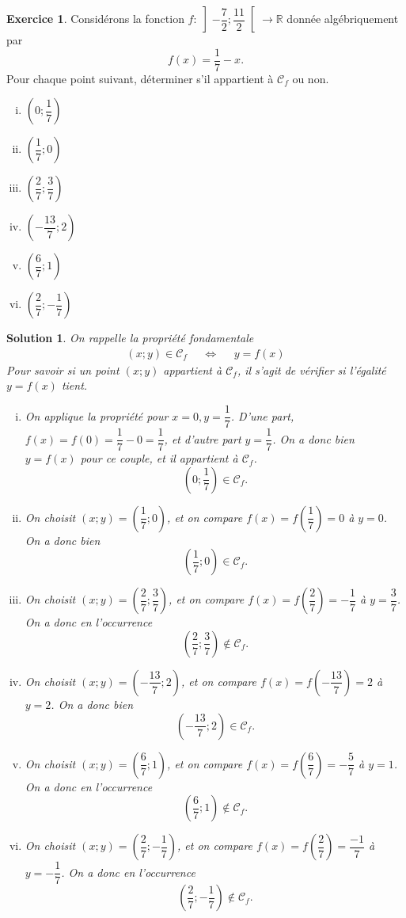 \documentclass[a4paper, 14pt]{extarticle}
\theoremstyle{plain}
\newtheorem*{sol}{Solution}
\theoremstyle{definition}
\newtheorem{ex}{Exercice}
\newcommand{\C}{\mathcal{C}}
\newcommand{\R}{\mathbb{R}}
\newif\ifsolutions
\newcommand{\exe}[2]{
		\begin{ex} #1  \end{ex}
		\begin{sol} #2 \end{sol}
	}
\newcommand{\exe}[2]{
		\begin{ex} #1  \end{ex}
	}
\begin{document}
\pagestyle{fancy}
\fancyhead[C]{\textbf{Fonctions 2 \ifsolutions -- Solutions  \fi}}
\fancyhead[R]{\today}


	\exe{
		Considérons la fonction $f: \left]{-}\dfrac72 ; \dfrac{11}2 \right[ \rightarrow\R$ donnée algébriquement par
			\[ f(x) = \dfrac17-x. \]
		Pour chaque point suivant, déterminer s'il appartient à $\C_f$ ou non.
		
		\begin{multicols}{2}
		\begin{enumerate}[i)]
			\item $\left(0; \dfrac17\right)$
			\item $\left(\dfrac17 ; 0\right)$
			\item $\left(\dfrac27 ; \dfrac37\right)$
			\item $\left(-\dfrac{13}7 ; 2\right)$
			\item $\left(\dfrac67 ; 1\right)$
			\item $\left(\dfrac27 ; -\dfrac17\right)$
		\end{enumerate}
		\end{multicols}
	
	}{
	On rappelle la propriété fondamentale
		\begin{align*}
			(x;y) \in \C_f && \iff && y = f(x)
		\end{align*}
	Pour savoir si un point $(x;y)$ appartient à $\C_f$, il s'agit de vérifier si l'égalité $y=f(x)$ tient.
	
		\begin{enumerate}[i)]
			\item On applique la propriété pour $x = 0, y= \dfrac17$.
			D'une part, $f(x) = f(0) = \dfrac17 - 0 = \dfrac17$, et d'autre part $y=\dfrac17$.
			On a donc bien $y=f(x)$ pour ce couple, et il appartient à $\C_f$.
				\[ \left(0; \dfrac17\right) \in \C_f. \]
			
			\item On choisit $(x;y) = \left(\dfrac17 ; 0\right)$, et on compare $f(x) = f\left(\dfrac17\right) = 0$ à $y=0$. 
			On a donc bien
				\[ \left(\dfrac17 ; 0\right) \in \C_f. \]
				
			\item On choisit $(x;y) = \left(\dfrac27 ; \dfrac37\right)$, et on compare $f(x) = f\left(\dfrac27\right) = -\dfrac17$ à $y=\dfrac37$. 
			On a donc en l'occurrence
				\[ \left(\dfrac27 ; \dfrac37\right) \not\in \C_f. \]
				
			\item On choisit $(x;y) = \left(-\dfrac{13}7 ; 2\right)$, et on compare $f(x) = f\left(-\dfrac{13}7\right) = 2$ à $y=2$. 
			On a donc bien
				\[ \left(-\dfrac{13}7 ; 2\right) \in \C_f. \]
			\item On choisit $(x;y) = \left(\dfrac67 ; 1\right)$, et on compare $f(x) = f\left(\dfrac67\right) = -\dfrac57$ à $y=1$. 
			On a donc en l'occurrence
				\[ \left(\dfrac67 ; 1\right) \not\in \C_f. \]
			\item On choisit $(x;y) = \left(\dfrac27 ; -\dfrac17\right)$, et on compare $f(x) = f\left(\dfrac27\right) = \dfrac{-1}7$ à $y=-\dfrac17$. 
			On a donc en l'occurrence
				\[ \left(\dfrac27 ; -\dfrac17\right) \not\in \C_f. \]
		\end{enumerate}
	
}
\end{document}
